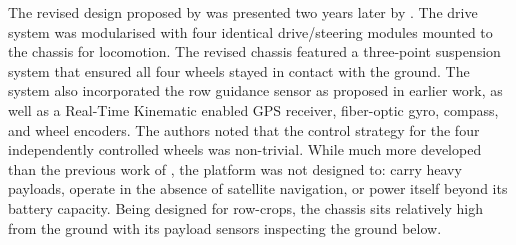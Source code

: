 \documentclass[preprint,authoryear,12pt]{elsarticle}
\begin{document}

        The revised design proposed by \cite{Pedersen2002} was presented two years later by \cite{Bak2004}.
        The drive system was modularised with four identical drive/steering modules mounted to the chassis for locomotion.
        The revised chassis featured a three-point suspension system that ensured all four wheels stayed in contact with the ground.
        The system also incorporated the row guidance sensor as proposed in earlier work, as well as a Real-Time Kinematic enabled GPS receiver, fiber-optic gyro, compass, and wheel encoders.
        The authors noted that the control strategy for the four independently controlled wheels was non-trivial.
        While much more developed than the previous work of \citep{Pedersen2002}, the platform was not designed to: carry heavy payloads, operate in the absence of satellite navigation, or power itself beyond its battery capacity.
        Being designed for row-crops, the chassis sits relatively high from the ground with its payload sensors inspecting the ground below.
\end{document}
